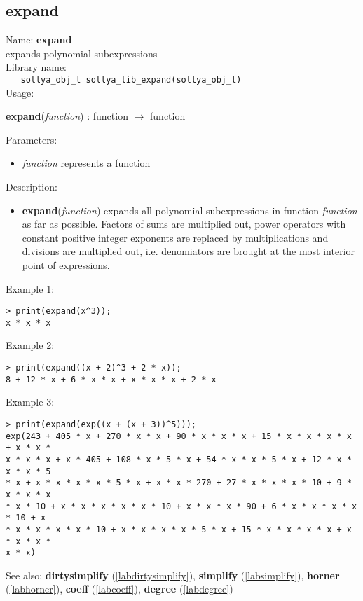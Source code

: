 \subsection{expand}
\label{labexpand}
\noindent Name: \textbf{expand}\\
\phantom{aaa}expands polynomial subexpressions\\[0.2cm]
\noindent Library name:\\
\verb|   sollya_obj_t sollya_lib_expand(sollya_obj_t)|\\[0.2cm]
\noindent Usage: 
\begin{center}
\textbf{expand}(\emph{function}) : \textsf{function} $\rightarrow$ \textsf{function}\\
\end{center}
Parameters: 
\begin{itemize}
\item \emph{function} represents a function
\end{itemize}
\noindent Description: \begin{itemize}

\item \textbf{expand}(\emph{function}) expands all polynomial subexpressions in function
   \emph{function} as far as possible. Factors of sums are multiplied out,
   power operators with constant positive integer exponents are replaced
   by multiplications and divisions are multiplied out, i.e. denomiators
   are brought at the most interior point of expressions.
\end{itemize}
\noindent Example 1: 
\begin{center}\begin{minipage}{15cm}\begin{Verbatim}[frame=single]
> print(expand(x^3));
x * x * x
\end{Verbatim}
\end{minipage}\end{center}
\noindent Example 2: 
\begin{center}\begin{minipage}{15cm}\begin{Verbatim}[frame=single]
> print(expand((x + 2)^3 + 2 * x));
8 + 12 * x + 6 * x * x + x * x * x + 2 * x
\end{Verbatim}
\end{minipage}\end{center}
\noindent Example 3: 
\begin{center}\begin{minipage}{15cm}\begin{Verbatim}[frame=single]
> print(expand(exp((x + (x + 3))^5)));
exp(243 + 405 * x + 270 * x * x + 90 * x * x * x + 15 * x * x * x * x + x * x * 
x * x * x + x * 405 + 108 * x * 5 * x + 54 * x * x * 5 * x + 12 * x * x * x * 5 
* x + x * x * x * x * 5 * x + x * x * 270 + 27 * x * x * x * 10 + 9 * x * x * x 
* x * 10 + x * x * x * x * x * 10 + x * x * x * 90 + 6 * x * x * x * x * 10 + x 
* x * x * x * x * 10 + x * x * x * x * 5 * x + 15 * x * x * x * x + x * x * x * 
x * x)
\end{Verbatim}
\end{minipage}\end{center}
See also: \textbf{dirtysimplify} (\ref{labdirtysimplify}), \textbf{simplify} (\ref{labsimplify}), \textbf{horner} (\ref{labhorner}), \textbf{coeff} (\ref{labcoeff}), \textbf{degree} (\ref{labdegree})
